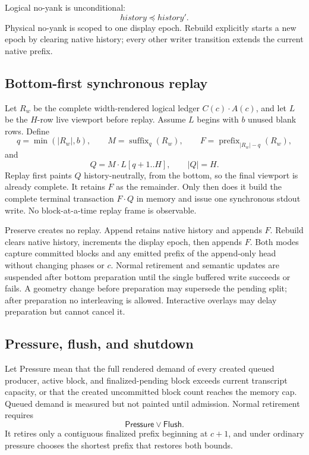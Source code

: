 \documentclass[11pt]{article}
\theoremstyle{definition}
\newcommand{\len}[1]{\lvert #1\rvert}
\newcommand{\cat}{\mathbin{\cdot}}
\newcommand{\prefixof}{\preceq}
\newcommand{\History}{\mathit{history}}
\begin{document}
Logical no-yank is unconditional:
\begin{equation}
  \History\prefixof\History'.
  \label{eq:logical-no-yank}
\end{equation}
Physical no-yank is scoped to one display epoch.  Rebuild explicitly starts a
new epoch by clearing native history; every other writer transition extends
the current native prefix.

\subsection{Bottom-first synchronous replay}

Let $R_w$ be the complete width-rendered logical ledger
$C(c)\cat A(c)$, and let $L$ be the $H$-row live viewport before replay.
Assume $L$ begins with $b$ unused blank rows.  Define
\[
  q=\min(\len{R_w},b),\qquad
  M=\operatorname{suffix}_q(R_w),\qquad
  F=\operatorname{prefix}_{\len{R_w}-q}(R_w),
\]
and
\begin{equation}
  Q=M\cat L[q+1..H],\qquad \len{Q}=H.
  \label{eq:replay-split}
\end{equation}
Replay first paints $Q$ history-neutrally, from the bottom, so the final
viewport is already complete.  It retains $F$ as the remainder.  Only then
does it build the complete terminal transaction $F\cat Q$ in memory and issue
one synchronous stdout write.  No block-at-a-time replay frame is observable.

Preserve creates no replay.  Append retains native history and appends $F$.
Rebuild clears native history, increments the display epoch, then appends $F$.
Both modes capture committed blocks and any emitted prefix of the append-only
head without changing phases or $c$.  Normal retirement and semantic updates
are suspended after bottom preparation until the single buffered write
succeeds or fails.  A geometry change before preparation may supersede the
pending split; after preparation no interleaving is allowed.  Interactive
overlays may delay preparation but cannot cancel it.

\subsection{Pressure, flush, and shutdown}

Let \textsf{Pressure} mean that the full rendered demand of every created
queued producer, active block, and finalized-pending block exceeds current
transcript capacity, or that the created uncommitted block count reaches the
memory cap.  Queued demand is measured but not painted until admission.  Normal
retirement requires
\[
  \mathsf{Pressure}\lor\mathsf{Flush}.
\]
It retires only a contiguous finalized prefix beginning at $c+1$, and under
ordinary pressure chooses the shortest prefix that restores both bounds.
\end{document}
